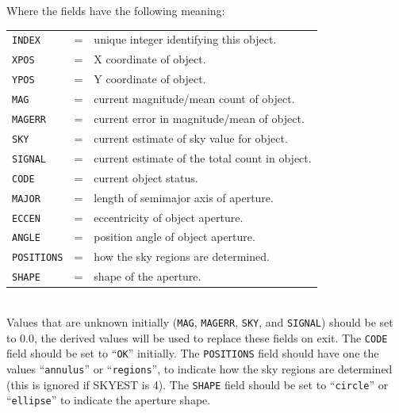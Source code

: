 \documentclass[twoside,11pt,nolof]{starlink}
\providecommand{\ft}[1]{``\texttt{#1}''}
\begin{document}
{{{        Where the fields have the following meaning:\\
        \begin{tabular}{lll}
           \texttt{INDEX}   &  = & unique integer identifying this object. \\
           \texttt{XPOS}    &  = & X coordinate of object.\\
           \texttt{YPOS}    &  = & Y coordinate of object.\\
           \texttt{MAG}     &  = & current magnitude/mean count of object.\\
           \texttt{MAGERR}  &  = & current error in magnitude/mean of object.\\
           \texttt{SKY}     &  = & current estimate of sky value for object.\\
           \texttt{SIGNAL}  &  = & current estimate of the total count in object.\\
           \texttt{CODE}    & =  & current object status.\\
           \texttt{MAJOR}   & =  & length of semimajor axis of aperture.\\
           \texttt{ECCEN}   &  = & eccentricity of object aperture.\\
           \texttt{ANGLE}   &  = & position angle of object aperture.\\
           \texttt{POSITIONS} &= & how the sky regions are determined.\\
           \texttt{SHAPE}     &= & shape of the aperture.\\
        \end{tabular}\\
       Values that are unknown initially (\texttt{MAG}, \texttt{MAGERR},
       \texttt{SKY}, and \texttt{SIGNAL})
       should be set to 0.0, the derived values will be used to replace
       these fields on exit. The \texttt{CODE} field should be set to \ft{OK}
       initially. The \texttt{POSITIONS} field should have one the values
       \ft{annulus} or \ft{regions}, to indicate how
       the sky regions are determined (this is ignored if SKYEST is 4).
       The \texttt{SHAPE} field should be set to \ft{circle} or
       \ft{ellipse} to indicate the aperture shape.\\

}}}
\end{document}
